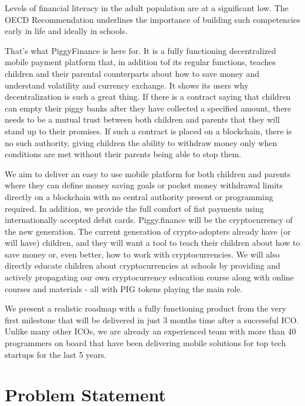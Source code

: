 \documentclass[english]{article}
\begin{document}
Levels of financial literacy in the adult population are at a significant low. The OECD Recommendation \cite{oecd2016} underlines the importance of building such competencies early in life and ideally in schools.

That's what PiggyFinance is here for. It is a fully functioning decentralized mobile payment platform that, in addition tof its regular functions, teaches children and their parental counterparts about how to save money and understand volatility and currency exchange. It shows its users why decentralization is such a great thing. If there is a contract saying that children can empty their piggy banks after they have collected a specified amount, there needs to be a mutual trust between both children and parents that they will stand up to their promises. If such a contract is placed on a blockchain, there is no such authority, giving children the ability to withdraw money only when conditions are met without their parents being able to stop them. 

We aim to deliver an easy to use mobile platform for both children and parents where they can define money saving goals or pocket money withdrawal limits directly on a blockchain with no central authority present or programming required. In addition, we provide the full comfort of fiat payments using internationally accepted debit cards. 
Piggy.finance will be the cryptocurrency of the new generation. The current generation of crypto-adopters already have (or will have) children, and they will want a tool to teach their children about how to save money or, even better, how to work with cryptocurrencies. We will also directly educate children about cryptocurrencies at schools by providing and actively propagating our own cryptocurrency education course along with online courses and materials - all with PIG tokens playing the main role.

We present a realistic roadmap with a fully functioning product from the very first milestone that will be delivered in just 3 months time after a successful ICO. Unlike many other ICOs, we are already an experienced team with more than 40 programmers on board that have been delivering mobile solutions for top tech startups for the last 5 years.



\section{Problem Statement}
\end{document}

